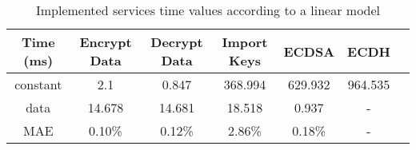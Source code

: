 \begin{table}[h!]
\centering
\def\arraystretch{1.5}
\begin{tabular}{|c|c|c|c|c|c|c|}
\hline
	Time (ms) & Encrypt Data  & Decrypt Data  & Import Keys & ECDSA & ECDH   \\ \hline
	constant  & 2.1    & 0.847  & 368.994  & 629.932 & 964.535 \\ \hline
	data      & 14.678 & 14.681 & 18.518 & 0.937 & - \\ \hline
	MAE	  & 0.10\% & 0.12\%  & 2.86\% & 0.18\% & - \\ \hline
\end{tabular}
\caption{Implemented services time values according to a linear model}
\label{tab:services-model}
\end{table}

